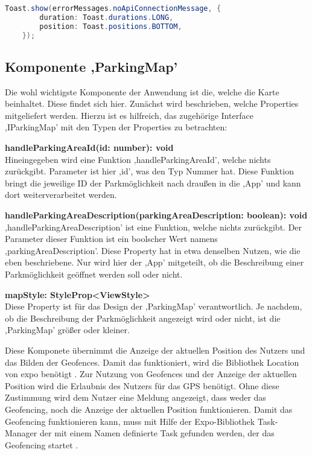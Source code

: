 \begin{lstlisting}[caption={Ein Beispiel des Aufrufs eines Toasts aus der Datei ,DbConnectionService.ts'. (Quelle: Eigene Implementierung)},captionpos=b, language=Java, label=lst:toast]
	Toast.show(errorMessages.noApiConnectionMessage, {
		duration: Toast.durations.LONG,
		position: Toast.positions.BOTTOM,
	});
\end{lstlisting}

\subsection{Komponente ,ParkingMap'}
Die wohl wichtigste Komponente der Anwendung ist die, welche die Karte beinhaltet. Diese findet sich hier. Zunächst wird beschrieben, welche Properties mitgeliefert werden. Hierzu ist es hilfreich, das zugehörige Interface ,IParkingMap' mit den Typen der Properties zu betrachten:
\begin{description}
	\item \textbf{handleParkingAreaId(id: number): void} \\ Hineingegeben wird eine Funktion ,handleParkingAreaId', welche nichts zurückgibt. Parameter ist hier ,id', was den Typ Nummer hat. Diese Funktion bringt die jeweilige ID der Parkmöglichkeit nach draußen in die ,App' und kann dort weiterverarbeitet werden.
	\item \textbf{handleParkingAreaDescription(parkingAreaDescription: boolean): void} \\ ,handleParkingAreaDescription' ist eine Funktion, welche nichts zurückgibt. Der Parameter dieser Funktion ist ein boolscher Wert namens ,parkingAreaDescription'. Diese Property hat in etwa denselben Nutzen, wie die eben beschriebene. Nur wird hier der ,App' mitgeteilt, ob die Beschreibung einer Parkmöglichkeit geöffnet werden soll oder nicht.
	\item \textbf{mapStyle: StyleProp<ViewStyle>} \\ Diese Property ist für das Design der ,ParkingMap' verantwortlich. Je nachdem, ob die Beschreibung der Parkmöglichkeit angezeigt wird oder nicht, ist die ,ParkingMap' größer oder kleiner.
\end{description}

Diese Komponete übernimmt die Anzeige der aktuellen Position des Nutzers und das Bilden der Geofences. Damit das funktioniert, wird die Bibliothek Location von expo benötigt \cite{expoLocation}. Zur Nutzung von Geofences und der Anzeige der aktuellen Position wird die Erlaubnis des Nutzers für das GPS benötigt. Ohne diese Zustimmung wird dem Nutzer eine Meldung angezeigt, dass weder das Geofencing, noch die Anzeige der aktuellen Position funktionieren. Damit das Geofencing funktionieren kann, muss mit Hilfe der Expo-Bibliothek Task-Manager der mit einem Namen definierte Task gefunden werden, der das Geofencing startet \cite{taskmanager}.

